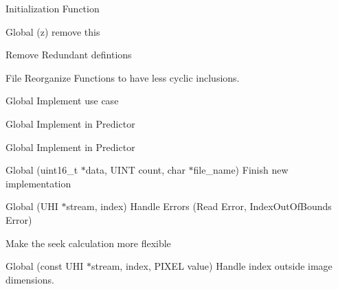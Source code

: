 \begin{DoxyRefList}
Initialization Function  
\item[Global \doxylink{predictor_8h_a2fee6f8dd7f3cd3ed1ae75161294c4c4}{Ps} (z)]\label{todo__todo000020}%
%
remove this 

\label{todo__todo000025}%
%
Remove Redundant defintions  
\item[File \doxylink{quantizer_8h}{quantizer.h} ]\label{todo__todo000022}%
%
Reorganize Functions to have less cyclic inclusions.  
\item[Global \doxylink{structs__predictor__constants_aa9543722f3ac4cee7db1aa2c20c289e9}{s\+\_\+predictor\+\_\+constants\+::k\+Lossless\+Compression} ]\label{todo__todo000005}%
%
Implement use case  
\item[Global \doxylink{structs__predictor__constants_a28a0b943ff8fd3c6785446e6e6bee86b}{s\+\_\+predictor\+\_\+constants\+::k\+Weight\+Exponent\+Offset\+Flag} ]\label{todo__todo000007}%
%
Implement in Predictor  
\item[Global \doxylink{structs__predictor__constants_adbe6968c0ea7ede4b53717162999a6dd}{s\+\_\+predictor\+\_\+constants\+::k\+Weight\+Initialization} ]\label{todo__todo000006}%
%
Implement in Predictor  
\item[Global \doxylink{csv-io_8h_a3e3e00c9789afb1d2f5f2c7004bd82ad}{Save\+Array\+As\+CSV} (uint16\+\_\+t \texorpdfstring{$\ast$}{*}data, UINT count, char \texorpdfstring{$\ast$}{*}file\+\_\+name)]\label{todo__todo000012}%
%
Finish new implementation  
\item[Global \doxylink{uhi__io_8h_ad7fd2d84633ee6e0355a950deeacd220}{UHI\+\_\+\+Read\+Pixel} (UHI \texorpdfstring{$\ast$}{*}stream, \doxylink{structdim3}{dim3} index)]\label{todo__todo000015}%
%
Handle Errors (Read Error, Index\+Out\+Of\+Bounds Error) 



Make the seek calculation more flexible  
\item[Global \doxylink{uhi__io_8h_a9c23d248f87897f71d177a12cdfebf84}{UHI\+\_\+\+Write\+Pixel} (const UHI \texorpdfstring{$\ast$}{*}stream, \doxylink{structdim3}{dim3} index, PIXEL value)]\label{todo__todo000014}%
%
Handle index outside image dimensions. 
\end{DoxyRefList}